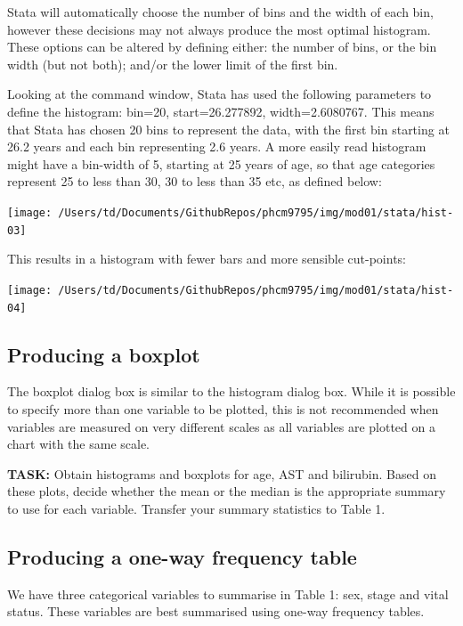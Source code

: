 \documentclass[
]{memoir}
\begin{document}
Stata will automatically choose the number of bins and the width of each bin, however these decisions may not always produce the most optimal histogram. These options can be altered by defining either: the number of bins, or the bin width (but not both); and/or the lower limit of the first bin.

Looking at the command window, Stata has used the following parameters to define the histogram: bin=20, start=26.277892, width=2.6080767. This means that Stata has chosen 20 bins to represent the data, with the first bin starting at 26.2 years and each bin representing 2.6 years. A more easily read histogram might have a bin-width of 5, starting at 25 years of age, so that age categories represent 25 to less than 30, 30 to less than 35 etc, as defined below:

\texttt{[image: /Users/td/Documents/GithubRepos/phcm9795/img/mod01/stata/hist-03]}

This results in a histogram with fewer bars and more sensible cut-points:

\texttt{[image: /Users/td/Documents/GithubRepos/phcm9795/img/mod01/stata/hist-04]}

\hypertarget{producing-a-boxplot}{%
\subsection{Producing a boxplot}\label{producing-a-boxplot}}

The boxplot dialog box is similar to the histogram dialog box. While it is possible to specify more than one variable to be plotted, this is not recommended when variables are measured on very different scales as all variables are plotted on a chart with the same scale.

\textbf{TASK:} Obtain histograms and boxplots for age, AST and bilirubin. Based on these plots, decide whether the mean or the median is the appropriate summary to use for each variable. Transfer your summary statistics to Table 1.

\hypertarget{producing-a-one-way-frequency-table}{%
\subsection{Producing a one-way frequency table}\label{producing-a-one-way-frequency-table}}

We have three categorical variables to summarise in Table 1: sex, stage and vital status. These variables are best summarised using one-way frequency tables.
\end{document}
